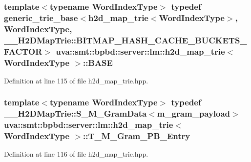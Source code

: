 \subsubsection[{B\+A\+S\+E}]{\setlength{\rightskip}{0pt plus 5cm}template$<$typename Word\+Index\+Type$>$ typedef {\bf generic\+\_\+trie\+\_\+base}$<${\bf h2d\+\_\+map\+\_\+trie}$<${\bf Word\+Index\+Type}$>$, {\bf Word\+Index\+Type}, \+\_\+\+\_\+\+H2\+D\+Map\+Trie\+::\+B\+I\+T\+M\+A\+P\+\_\+\+H\+A\+S\+H\+\_\+\+C\+A\+C\+H\+E\+\_\+\+B\+U\+C\+K\+E\+T\+S\+\_\+\+F\+A\+C\+T\+O\+R$>$ {\bf uva\+::smt\+::bpbd\+::server\+::lm\+::h2d\+\_\+map\+\_\+trie}$<$ {\bf Word\+Index\+Type} $>$\+::{\bf B\+A\+S\+E}}\label{classuva_1_1smt_1_1bpbd_1_1server_1_1lm_1_1h2d__map__trie_a2259d6bc61a4d48aa9b535ba70d43818}


Definition at line 115 of file h2d\+\_\+map\+\_\+trie.\+hpp.

\hypertarget{classuva_1_1smt_1_1bpbd_1_1server_1_1lm_1_1h2d__map__trie_a5cfbfeaf2fb49b69d3b80a5f0a33bffb}{}
\subsubsection[{T\+\_\+\+M\+\_\+\+Gram\+\_\+\+P\+B\+\_\+\+Entry}]{\setlength{\rightskip}{0pt plus 5cm}template$<$typename Word\+Index\+Type$>$ typedef {\bf \+\_\+\+\_\+\+H2\+D\+Map\+Trie\+::\+S\+\_\+\+M\+\_\+\+Gram\+Data}$<${\bf m\+\_\+gram\+\_\+payload}$>$ {\bf uva\+::smt\+::bpbd\+::server\+::lm\+::h2d\+\_\+map\+\_\+trie}$<$ {\bf Word\+Index\+Type} $>$\+::{\bf T\+\_\+\+M\+\_\+\+Gram\+\_\+\+P\+B\+\_\+\+Entry}}\label{classuva_1_1smt_1_1bpbd_1_1server_1_1lm_1_1h2d__map__trie_a5cfbfeaf2fb49b69d3b80a5f0a33bffb}


Definition at line 116 of file h2d\+\_\+map\+\_\+trie.\+hpp.

\hypertarget{classuva_1_1smt_1_1bpbd_1_1server_1_1lm_1_1h2d__map__trie_a54dc925858461c06d788b62ab860a81b}{}
